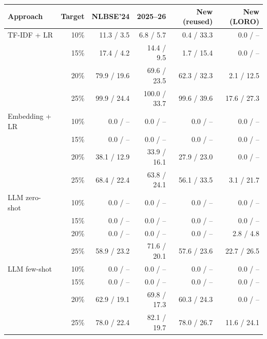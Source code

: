 \begin{tabular}{lrrrrr}
\toprule
Approach & Target & NLBSE'24 & 2025--26 & New (reused) & New (LORO) \\
\midrule
TF-IDF + LR & 10\% & 11.3 / 3.5 & 6.8 / 5.7 & 0.4 / 33.3 & 0.0 / -- \\
 & 15\% & 17.4 / 4.2 & 14.4 / 9.5 & 1.7 / 15.4 & 0.0 / -- \\
 & 20\% & 79.9 / 19.6 & 69.6 / 23.5 & 62.3 / 32.3 & 2.1 / 12.5 \\
 & 25\% & 99.9 / 24.4 & 100.0 / 33.7 & 99.6 / 39.6 & 17.6 / 27.3 \\
\midrule
Embedding + LR & 10\% & 0.0 / -- & 0.0 / -- & 0.0 / -- & 0.0 / -- \\
 & 15\% & 0.0 / -- & 0.0 / -- & 0.0 / -- & 0.0 / -- \\
 & 20\% & 38.1 / 12.9 & 33.9 / 16.1 & 27.9 / 23.0 & 0.0 / -- \\
 & 25\% & 68.4 / 22.4 & 63.8 / 24.1 & 56.1 / 33.5 & 3.1 / 21.7 \\
\midrule
LLM zero-shot & 10\% & 0.0 / -- & 0.0 / -- & 0.0 / -- & 0.0 / -- \\
 & 15\% & 0.0 / -- & 0.0 / -- & 0.0 / -- & 0.0 / -- \\
 & 20\% & 0.0 / -- & 0.0 / -- & 0.0 / -- & 2.8 / 4.8 \\
 & 25\% & 58.9 / 23.2 & 71.6 / 20.1 & 57.6 / 23.6 & 22.7 / 26.5 \\
\midrule
LLM few-shot & 10\% & 0.0 / -- & 0.0 / -- & 0.0 / -- & 0.0 / -- \\
 & 15\% & 0.0 / -- & 0.0 / -- & 0.0 / -- & 0.0 / -- \\
 & 20\% & 62.9 / 19.1 & 69.8 / 17.3 & 60.3 / 24.3 & 0.0 / -- \\
 & 25\% & 78.0 / 22.4 & 82.1 / 19.7 & 78.0 / 26.7 & 11.6 / 24.1 \\
\bottomrule
\end{tabular}

